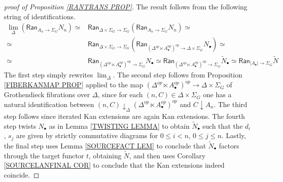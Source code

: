 \documentclass[a4paper,10pt
,draft
]{article}%
\numberwithin{equation}{section}
\numberwithin{figure}{section}
\theoremstyle{definition} %
\newcommand{\1}{\ensuremath{\mathbbm 1}}%
\begin{document}
\begin{proof}[proof of Proposition \ref{RANTRANS PROP}]
The result follows from the following string of identifications.
\begin{align*}
	\lim_{\Delta}
	\left(
	\mathsf{Ran}_{A_n \to \Sigma_G}
	N_{n}
	\right)
	\simeq &
	\mathsf{Ran}_{\Delta \times \Sigma_G \to \Sigma_G}
	\left(
	\mathsf{Ran}_{A_n \to \Sigma_G}
	N_n
	\right) \simeq
\\
	\simeq &
	\mathsf{Ran}_{\Delta \times \Sigma_G \to \Sigma_G}
	\left(
	\mathsf{Ran}_{(\Delta^{op} \ltimes A^{op}_{\bullet})^{op} \to
	\Delta \times \Sigma_G}
	N_{\bullet}
	\right) \simeq
\\
	\simeq &
	\mathsf{Ran}_{
	(\Delta^{op} \ltimes A^{op}_{\bullet})^{op} \to
	\Sigma_G}
	N_{\bullet}
	\simeq 
	\mathsf{Ran}_{
	(\Delta^{op} \ltimes A^{op}_{\bullet})^{op} \to \Sigma_G}
	\tilde{N}_{\bullet}
	\simeq
	\mathsf{Ran}_{
	|A_{\bullet}| \to \Sigma_G}
	\tilde{N}
\end{align*}
The first step simply rewrites 
$\lim_{\Delta}$. 
The second step 
follows from Proposition \ref{FIBERKANMAP PROP} applied to the map 
$(\Delta^{op} \ltimes A^{op}_{\bullet})^{op} \to
\Delta \times \Sigma_G$
of Grothendieck fibrations over $\Delta$,
since for each
$(n,C) \in \Delta \times \Sigma_G$
one has a natural identification
between
$(n,C) \downarrow_{\Delta} (\Delta^{op} \ltimes A^{op}_{\bullet})^{op}$
and
$C \downarrow A_n$.
The third step follows since iterated Kan extensions are again Kan extensions.
The fourth step twists $N_{\bullet}$
as in Lemma \ref{TWISTING LEMMA}
to obtain $\tilde{N}_{\bullet}$
such that the $d_i$, $s_j$ are given by strictly commutative diagrams for
$0\leq i < n$, $0\leq j \leq n$.
Lastly, the final step uses Lemma \ref{SOURCEFACT LEM}
to conclude that 
$\tilde{N}_{\bullet}$ factors through the
target functor $t$, obtaining $\tilde{N}$, 
and then uses 
Corollary \ref{SOURCELANFINAL COR}
to conclude that the Kan extensions indeed coincide.
\end{proof}





\newpage

\printindex


\newpage
{}

\end{document}
